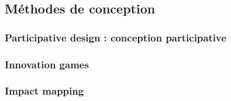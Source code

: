 		
	\subsection{Méthodes de conception}
		\subsubsection{Participative design : conception participative}
		
		\subsubsection{Innovation games}
		
		\subsubsection{Impact mapping}